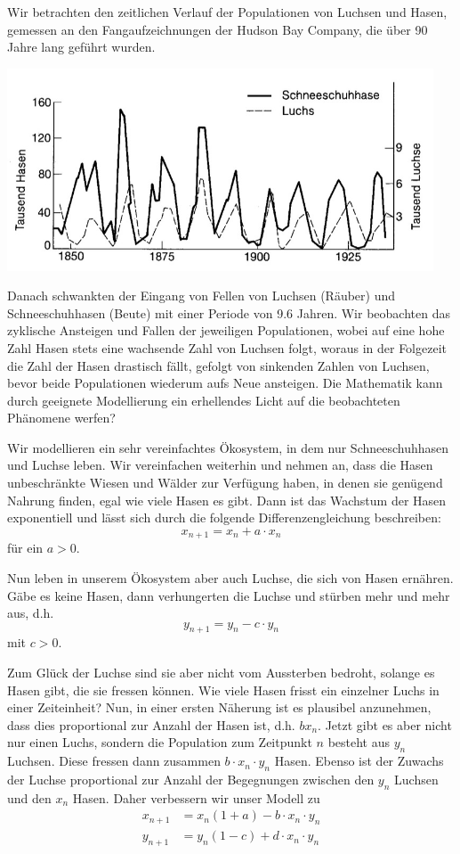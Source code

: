 \documentclass[%
11pt,%
twoside,%
titlepage,%
german,%
headsepline%
]{scrartcl}
\begin{document}
Wir betrachten den zeitlichen Verlauf der Populationen von Luchsen
und Hasen, gemessen an den Fangaufzeichnungen der Hudson Bay Company,
die über 90 Jahre lang geführt wurden.

\begin{center}
\includegraphics[height=6cm]{pictures/haseluchs.jpg}
\end{center}

Danach schwankten der Eingang von Fellen von Luchsen (Räuber) und Schneeschuhhasen (Beute) mit einer Periode von 9.6 Jahren. Wir beobachten das zyklische Ansteigen und Fallen der
jeweiligen Populationen, wobei auf eine hohe Zahl Hasen stets eine wachsende Zahl von Luchsen folgt, woraus in der Folgezeit die Zahl der Hasen drastisch fällt, gefolgt von sinkenden Zahlen von Luchsen, bevor beide Populationen wiederum aufs Neue ansteigen. Die Mathematik kann durch geeignete Modellierung ein erhellendes Licht auf die beobachteten Phänomene werfen?

Wir modellieren ein sehr vereinfachtes Ökosystem, in dem nur Schneeschuhhasen und Luchse leben. Wir vereinfachen weiterhin und nehmen an, dass die Hasen unbeschränkte Wiesen und Wälder zur Verfügung haben, in denen sie genügend Nahrung finden, egal wie viele Hasen es gibt. Dann ist das Wachstum der Hasen exponentiell und lässt sich durch die folgende Differenzengleichung beschreiben:
$$x_{n+1}=x_n+a\cdot x_n$$
für ein $a>0$.

Nun leben in unserem Ökosystem aber auch Luchse, die sich von Hasen ernähren. Gäbe es keine Hasen, dann verhungerten die Luchse und stürben mehr und mehr aus, d.h.
$$y_{n+1}=y_n-c\cdot y_n$$
mit $c>0$.

Zum Glück der Luchse sind sie aber nicht vom Aussterben bedroht, solange es Hasen gibt, die sie fressen können. Wie viele Hasen frisst ein einzelner Luchs in einer Zeiteinheit? Nun, in einer ersten Näherung ist es plausibel anzunehmen, dass dies proportional zur Anzahl der Hasen ist, d.h. $bx_n$. Jetzt gibt es aber nicht nur einen Luchs, sondern die Population zum Zeitpunkt $n$ besteht aus $y_n$ Luchsen. Diese fressen dann zusammen $b\cdot x_n\cdot y_n$ Hasen. Ebenso ist der Zuwachs der Luchse proportional zur Anzahl der Begegnungen zwischen den $y_n$ Luchsen und den $x_n$ Hasen. Daher verbessern wir unser Modell zu
\begin{align*}
x_{n+1}&=x_n(1+a)-b\cdot x_n\cdot y_n\\
y_{n+1}&=y_n(1-c)+d\cdot x_n\cdot y_n
\end{align*}
\end{document}
